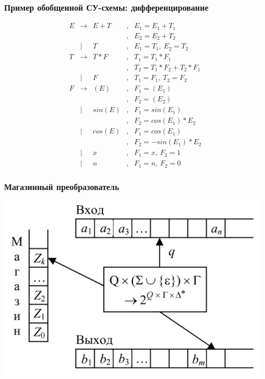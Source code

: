 \documentclass{beamer}
\begin{document}
\begin{frame}[fragile]
  \transwipe[direction=90]
  \frametitle{Пример обобщенной СУ-схемы: дифференцирование}
$$
\begin{array}{ccclcl}
&E& \rightarrow & E + T &,& E_1 = E_1 + T_1 \\
& &             &       &,& E_2 = E_2 + T_2 \\
& &      |      &     T &,& E_1 = T_1, \ E_2 = T_2  \\

&T& \rightarrow & T * F &,& T_1 = T_1 * F_1 \\
& &             &       &,& T_2 = T_1 * F_2 + T_2 * F_1\\
& &      |      &     F &,& T_1 = F_1, \ T_2 = F_2 \\

&F& \rightarrow & ( E ) &,& F_1 = (E_1) \\
& &             &       &,& F_2 = (E_2) \\
& &      |      & sin(E)&,& F_1 = sin(E_1) \\
& &             &       &,& F_2 = cos(E_1) * E_2 \\
& &      |      & cos(E)&,& F_1 = cos(E_1) \\
& &             &       &,& F_2 = -sin(E_1) * E_2 \\
& &      |      &    x  &,& F_1 = x, \ F_2 = 1 \\
& &      |      &    n  &,& F_1 = n, \ F_2 = 0  
\end{array}
$$
\end{frame}


\begin{frame}[fragile]
  \transwipe[direction=90]
  \frametitle{Магазинный преобразователь}
\begin{center}
  \includegraphics[width=\textwidth]{pics/transducer.png}
\end{center} 

\end{frame}
\end{document}
